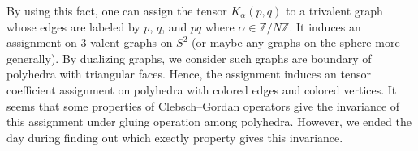 \documentclass[11pt]{amsart}
\begin{document}
By using this fact, one can assign the tensor $K_\alpha(p, q)$ to a trivalent graph whose edges are labeled by $p$, $q$, and $pq$ where $\alpha \in \mathbb{Z}/ N\mathbb{Z}$.
It induces an assignment on 3-valent graphs on $S^2$ (or maybe any graphs on the sphere more generally).
By dualizing graphs, we consider such graphs are boundary of polyhedra with triangular faces.
Hence, the assignment induces an tensor coefficient assignment on polyhedra with colored edges and colored vertices.
It seems that some properties of Clebsch--Gordan operators give the invariance of this assignment under gluing operation among polyhedra.
However, we ended the day during finding out which exectly property gives this invariance.




\end{document}
